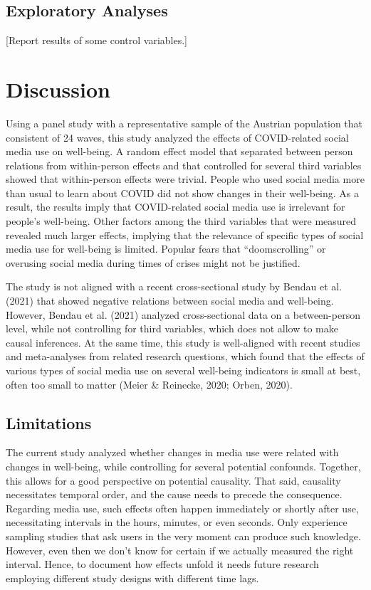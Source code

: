 \documentclass[
  english,
  man,floatsintext]{apa6}
\begin{document}
\hypertarget{exploratory-analyses}{%
\subsection{Exploratory Analyses}\label{exploratory-analyses}}

{[}Report results of some control variables.{]}

\hypertarget{discussion}{%
\section{Discussion}\label{discussion}}

Using a panel study with a representative sample of the Austrian population that consistent of 24 waves, this study analyzed the effects of COVID-related social media use on well-being.
A random effect model that separated between person relations from within-person effects and that controlled for several third variables showed that within-person effects were trivial.
People who used social media more than usual to learn about COVID did not show changes in their well-being.
As a result, the results imply that COVID-related social media use is irrelevant for people's well-being.
Other factors among the third variables that were measured revealed much larger effects, implying that the relevance of specific types of social media use for well-being is limited.
Popular fears that ``doomscrolling'' or overusing social media during times of crises might not be justified.

The study is not aligned with a recent cross-sectional study by Bendau et al. (2021) that showed negative relations between social media and well-being.
However, Bendau et al. (2021) analyzed cross-sectional data on a between-person level, while not controlling for third variables, which does not allow to make causal inferences.
At the same time, this study is well-aligned with recent studies and meta-analyses from related research questions, which found that the effects of various types of social media use on several well-being indicators is small at best, often too small to matter (Meier \& Reinecke, 2020; Orben, 2020).

\hypertarget{limitations}{%
\subsection{Limitations}\label{limitations}}

The current study analyzed whether changes in media use were related with changes in well-being, while controlling for several potential confounds.
Together, this allows for a good perspective on potential causality.
That said, causality necessitates temporal order, and the cause needs to precede the consequence.
Regarding media use, such effects often happen immediately or shortly after use, necessitating intervals in the hours, minutes, or even seconds.
Only experience sampling studies that ask users in the very moment can produce such knowledge.
However, even then we don't know for certain if we actually measured the right interval.
Hence, to document how effects unfold it needs future research employing different study designs with different time lags.
\end{document}
